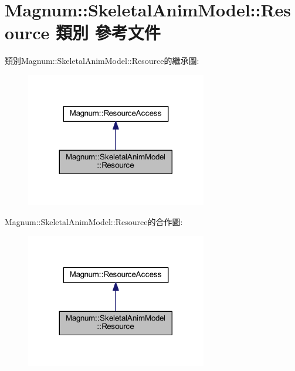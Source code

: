 \hypertarget{class_magnum_1_1_skeletal_anim_model_1_1_resource}{}\section{Magnum\+:\+:Skeletal\+Anim\+Model\+:\+:Resource 類別 參考文件}
\label{class_magnum_1_1_skeletal_anim_model_1_1_resource}


類別\+Magnum\+:\+:Skeletal\+Anim\+Model\+:\+:Resource的繼承圖\+:\nopagebreak
\begin{figure}[H]
\begin{center}
\leavevmode
\includegraphics[width=224pt]{class_magnum_1_1_skeletal_anim_model_1_1_resource__inherit__graph}
\end{center}
\end{figure}


Magnum\+:\+:Skeletal\+Anim\+Model\+:\+:Resource的合作圖\+:\nopagebreak
\begin{figure}[H]
\begin{center}
\leavevmode
\includegraphics[width=224pt]{class_magnum_1_1_skeletal_anim_model_1_1_resource__coll__graph}
\end{center}
\end{figure}

